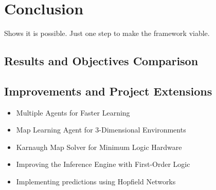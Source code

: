 






\chapter{Conclusion}
\label{chapter: Conclusion and Recommendations} 
Shows it is possible. Just one step to make the framework viable.


\section{Results and Objectives Comparison}
\section{Improvements and Project Extensions}

\begin{itemize}
	\item Multiple Agents for Faster Learning
	\item Map Learning Agent for 3-Dimensional Environments
	\item Karnaugh Map Solver for Minimum Logic Hardware
	\item Improving the Inference Engine with First-Order Logic
	\item Implementing predictions using Hopfield Networks
\end{itemize}









